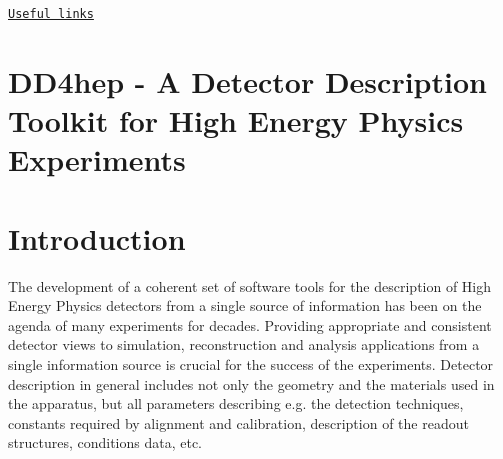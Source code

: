 \href{#UsefulLinks}{\tt Useful links}\hypertarget{index_MAIN}{}\section{DD4hep -\/ A Detector Description Toolkit for High Energy Physics Experiments}\label{index_MAIN}
\hypertarget{index_INTRO}{}\section{Introduction}\label{index_INTRO}
The development of a coherent set of software tools for the description of High Energy Physics detectors from a single source of information has been on the agenda of many experiments for decades. Providing appropriate and consistent detector views to simulation, reconstruction and analysis applications from a single information source is crucial for the success of the experiments. Detector description in general includes not only the geometry and the materials used in the apparatus, but all parameters describing e.g. the detection techniques, constants required by alignment and calibration, description of the readout structures, conditions data, etc.

